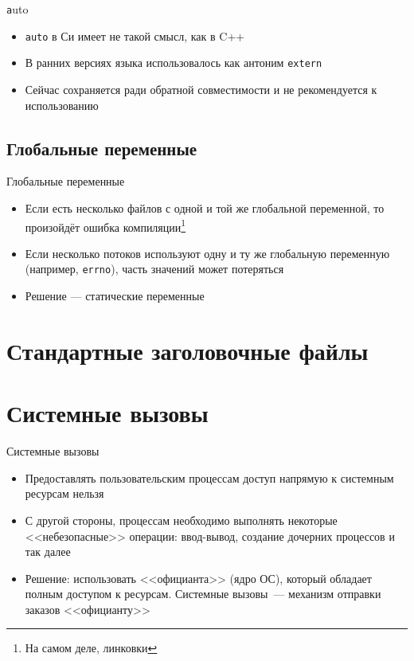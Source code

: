 \documentclass[handout]{beamer}
\begin{document}
\begin{frame}{\texttt auto}
	\begin{itemize}
		\item{\texttt{auto} в Си имеет не такой смысл, как в C++}\pause
		\item{В ранних версиях языка использовалось как антоним \texttt{extern}}\pause
		\item{Сейчас сохраняется ради обратной совместимости и не рекомендуется к использованию}
	\end{itemize}
\end{frame}

\subsection{Глобальные переменные}
\begin{frame}{Глобальные переменные}
	\begin{itemize}
		\item{Если есть несколько файлов с одной и той же глобальной переменной, то произойдёт ошибка компиляции\footnote{На самом деле, линковки}}\pause
		\item{Если несколько потоков используют одну и ту же глобальную переменную (например, \texttt{errno}), часть значений может потеряться}\pause
		\item{Решение --- статические переменные}
	\end{itemize}
\end{frame}
	
\section{Стандартные заголовочные файлы}

\section{Системные вызовы}
\begin{frame}{Системные вызовы}
	\begin{itemize}
		\item{Предоставлять пользовательским процессам доступ напрямую к системным ресурсам нельзя}\pause
		\item{С другой стороны, процессам необходимо выполнять некоторые <<небезопасные>> операции: ввод-вывод, создание дочерних процессов и так далее}\pause
		\item{Решение: использовать <<официанта>> (ядро ОС), который обладает полным доступом к ресурсам. Системные вызовы~--- механизм отправки заказов <<официанту>>}
	\end{itemize}
\end{frame}
\end{document}
